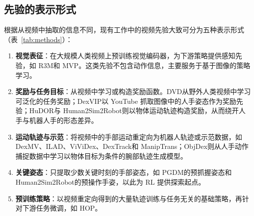 \documentclass[UTF8,a4paper,zihao=-4]{ctexart}
\begin{document}
\subsection{先验的表示形式}

根据从视频中抽取的信息不同，现有工作中的视频先验大致可分为五种表示形式（表~\ref{tab:methods}）：
\begin{enumerate}
  \item \textbf{视觉表征}：在大规模人类视频上预训练视觉编码器，为下游策略提供感知先验，如 R3M\cite{r3m}和 MVP\cite{mvp}。这类先验不包含动作信息，主要服务于基于图像的策略学习。
  \item \textbf{奖励与任务目标}：从视频中学习或构造奖励函数。DVD\cite{dvd}从野外人类视频中学习可泛化的任务奖励；DexVIP\cite{dexvip}以 YouTube 抓取图像中的人手姿态作为奖励先验；HuDOR\cite{hudor}与 Human2Sim2Robot\cite{human2sim2robot}则以物体运动轨迹构造奖励，从而绕开人手与机器人手的形态差异。
  \item \textbf{运动轨迹与示范}：将视频中的手部运动重定向为机器人轨迹或示范数据，如 DexMV\cite{dexmv}、ILAD\cite{ilad}、ViViDex\cite{vividex}、DexTrack\cite{dextrack}和 ManipTrans\cite{maniptrans}；ObjDex\cite{objdex}则从人手动作捕捉数据中学习以物体目标为条件的腕部轨迹生成模型。
  \item \textbf{关键姿态}：只提取少数关键时刻的手部姿态，如 PGDM\cite{pgdm}的预抓握姿态和 Human2Sim2Robot\cite{human2sim2robot}的预操作手姿，以此为 RL 提供探索起点。
  \item \textbf{预训练策略}：以视频重定向得到的大量轨迹训练与任务无关的基础策略，再针对下游任务微调，如 HOP\cite{hop}。
\end{enumerate}
\end{document}
